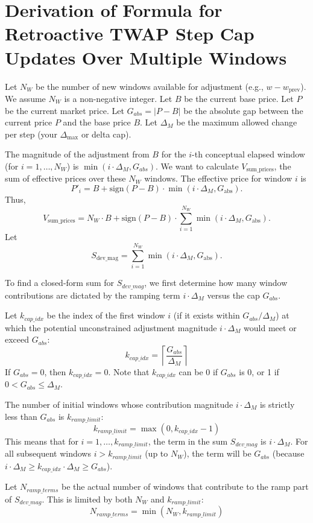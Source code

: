 \documentclass{article}
\begin{document}
\section*{Derivation of Formula for Retroactive TWAP Step Cap Updates Over Multiple Windows}

Let $N_W$ be the number of new windows available for adjustment (e.g., $w - w_{\text{prev}}$). We assume $N_W$ is a non-negative integer.
Let $B$ be the current base price.
Let $P$ be the current market price.
Let $G_{abs} = |P - B|$ be the absolute gap between the current price $P$ and the base price $B$.
Let $\Delta_M$ be the maximum allowed change per step (your $\Delta_{\max}$ or delta cap).

The magnitude of the adjustment from $B$ for the $i$-th conceptual elapsed window (for $i=1, \dots, N_W$) is $\min(i \cdot \Delta_M, G_{abs})$.
We want to calculate $V_{\text{sum\_prices}}$, the sum of effective prices over these $N_W$ windows. The effective price for window $i$ is
\[
P'_i = B + \text{sign}(P-B) \cdot \min(i \cdot \Delta_M, G_{\text{abs}}) .
\]
Thus,
\[
V_{\text{sum\_prices}}  = N_W \cdot B + \text{sign}(P-B) \cdot \sum_{i=1}^{N_W} \min(i \cdot \Delta_M, G_{\text{abs}}) .
\]
Let
\[
S_{\text{dev\_mag}} = \sum_{i=1}^{N_W} \min(i \cdot \Delta_M, G_{\text{abs}}) .
\]

To find a closed-form sum for $S_{dev\_mag}$, we first determine how many window contributions are dictated by the ramping term $i \cdot \Delta_M$ versus the cap $G_{abs}$.

Let $k_{cap\_idx}$ be the index of the first window $i$ (if it exists within $G_{abs}/\Delta_M$) at which the potential unconstrained adjustment magnitude $i \cdot \Delta_M$ would meet or exceed $G_{abs}$:
\[ k_{cap\_idx} = \left\lceil \frac{G_{abs}}{\Delta_M} \right\rceil \]
If $G_{abs} = 0$, then $k_{cap\_idx} = 0$. Note that $k_{cap\_idx}$ can be 0 if $G_{abs}$ is 0, or 1 if $0 < G_{abs} \le \Delta_M$.

The number of initial windows whose contribution magnitude $i \cdot \Delta_M$ is strictly less than $G_{abs}$ is $k_{ramp\_limit}$:
\[ k_{ramp\_limit} = \max(0, k_{cap\_idx} - 1) \]
This means that for $i=1, \dots, k_{ramp\_limit}$, the term in the sum $S_{dev\_mag}$ is $i \cdot \Delta_M$. For all subsequent windows $i > k_{ramp\_limit}$ (up to $N_W$), the term will be $G_{abs}$ (because $i \cdot \Delta_M \ge k_{cap\_idx} \cdot \Delta_M \ge G_{abs}$).

Let $N_{ramp\_terms}$ be the actual number of windows that contribute to the ramp part of $S_{dev\_mag}$. This is limited by both $N_W$ and $k_{ramp\_limit}$:
\[ N_{ramp\_terms} = \min(N_W, k_{ramp\_limit}) \]
\end{document}
